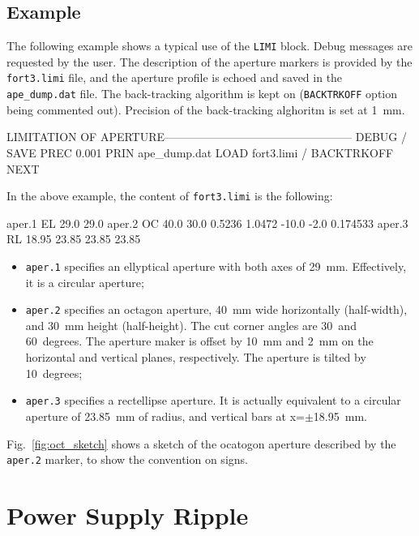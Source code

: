 \subsection{Example}\label{ApeLim:Example}
The following example shows a typical use of the \texttt{LIMI} block.
Debug messages are requested by the user.
The description of the aperture markers is provided by the \texttt{fort3.limi} file, and the aperture profile is echoed and saved in the \texttt{ape\_dump.dat} file.
The back-tracking algorithm is kept on (\texttt{BACKTRKOFF} option being commented out).
Precision of the back-tracking alghoritm is set at 1~mm.
\begin{cverbatim}
LIMITATION OF APERTURE--------------------------------------------------
DEBUG
/ SAVE
PREC        0.001
PRIN  ape_dump.dat
LOAD  fort3.limi
/ BACKTRKOFF
NEXT
\end{cverbatim}

In the above example, the content of \texttt{fort3.limi} is the following:
\begin{cverbatim}
aper.1        EL     29.0      29.0
aper.2        OC     40.0      30.0       0.5236    1.0472       -10.0       -2.0        0.174533
aper.3        RL     18.95     23.85      23.85      23.85
\end{cverbatim}
\begin{itemize}
\item \texttt{aper.1} specifies an ellyptical aperture with both axes of 29~mm. Effectively, it is a circular aperture;
\item \texttt{aper.2} specifies an octagon aperture, 40~mm wide horizontally (half-width), and 30~mm height (half-height).
  The cut corner angles are 30~and 60~degrees.
  The aperture maker is offset by 10~mm and 2~mm on the horizontal and vertical planes, respectively.
  The aperture is tilted by 10~degrees;
\item \texttt{aper.3} specifies a rectellipse aperture.
  It is actually equivalent to a circular aperture of 23.85~mm of radius, and vertical bars at x=$\pm$18.95~mm.
\end{itemize}
Fig.~\ref{fig:oct_sketch} shows a sketch of the ocatogon aperture described by the \texttt{aper.2} marker, to show the convention on signs.

\section{Power Supply Ripple} \label{PowRip}

